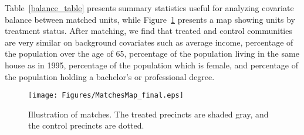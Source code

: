 
Table~\vref{balance_table} presents summary statistics useful for analyzing covariate balance between matched units, while Figure~\ref{matches} presents a map showing units by treatment status. After matching, we find that treated and control communities are very similar on background covariates such as average income, percentage of the population over the age of 65, percentage of the population living in the same house as in 1995, percentage of the population which is female, and percentage of the population holding a bachelor's or professional degree. 


        
\begin{figure}[!t]
    \centering
    \caption{Illustration of matches. The treated precincts are shaded gray, and the control precincts are dotted.}
 \texttt{[image: Figures/MatchesMap\_final.eps]}
\label{matches}
\end{figure}

\begin{table}[!t] 
    \centering  
{}
  \caption{Pre-treatment balance. Data from the 2000 Census. 
                           Sample size: 1324 treated and 1324 control
                           units.}
    \label{balance_table} 
\end{table} 
    

